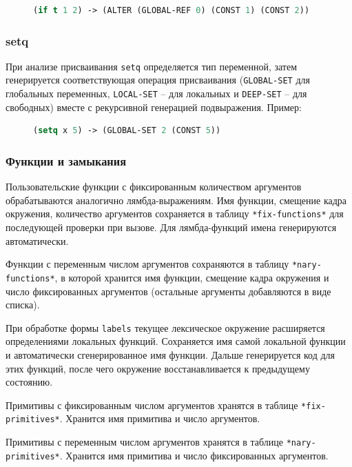\begin{figure}[H]
\begin{lstlisting}[language=Lisp]
(if t 1 2) -> (ALTER (GLOBAL-REF 0) (CONST 1) (CONST 2))
\end{lstlisting}
\end{figure}

\subsubsection{setq}

При анализе присваивания \texttt{setq} определяется тип переменной, затем генерируется соответствующая операция присваивания (\texttt{GLOBAL-SET} для глобальных переменных, \texttt{LOCAL-SET} -- для локальных и \texttt{DEEP-SET} -- для свободных) вместе с рекурсивной генерацией подвыражения. Пример:

\begin{figure}[H]
\begin{lstlisting}[language=Lisp]
(setq x 5) -> (GLOBAL-SET 2 (CONST 5))
\end{lstlisting}
\end{figure}

\subsubsection{Функции и замыкания}

Пользовательские функции с фиксированным количеством аргументов обрабатываются аналогично лямбда-выражениям. Имя функции, смещение кадра окружения, количество аргументов сохраняется в таблицу \texttt{*fix-functions*} для последующей проверки при вызове. Для лямбда-функций имена генерируются автоматически.

Функции с переменным числом аргументов сохраняются в таблицу \texttt{*nary-functions*}, в которой хранится имя функции, смещение кадра окружения и число фиксированных аргументов (остальные аргументы добавляются в виде списка).

При обработке формы \texttt{labels} текущее лексическое окружение расширяется определениями локальных функций. Сохраняется имя самой локальной функции и автоматически сгенерированное имя функции. Дальше генерируется код для этих функций, после чего окружение восстанавливается к предыдущему состоянию.

Примитивы с фиксированным числом аргументов хранятся в таблице \texttt{*fix-primitives*}. Хранится имя примитива и число аргументов.

Примитивы с переменным числом аргументов хранятся в таблице \texttt{*nary-primitives*}. Хранится имя примитива и число фиксированных аргументов.

